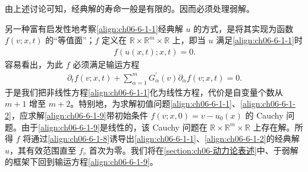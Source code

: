 \documentclass[../../main.tex]{subfiles}
\begin{document}
由上述讨论可知，经典解的寿命一般是有限的。因而必须处理弱解。

另一种富有启发性地考察\eqref{align:ch06-6-1-1}经典解 $u$ 的方式，是将其实现为函数 $f(v;x,t)$ 的“等值面”；$f$ 定义在 $\mathbb{R}\times\mathbb{R}^{m}\times\mathbb{R}$ 上，即当 $u$ 满足\eqref{align:ch06-6-1-1}时
\begin{align}
f(u(x,t);x,t)=0.
\label{align:ch06-6-1-8}
\end{align}
容易看出，为此 $f$ 必须满足输运方程
\begin{align}
\partial_{t}f(v;x,t)+\sum_{\alpha=1}^{m}G_{\alpha}^{\prime}(v)\partial_{\alpha}f(v;x,t)=0.
\label{align:ch06-6-1-9}
\end{align}
于是我们把非线性方程\eqref{align:ch06-6-1-1}化为线性方程，代价是自变量个数从 $m+1$ 增至 $m+2$。特别地，为求解初值问题\eqref{align:ch06-6-1-1}、\eqref{align:ch06-6-1-2}，应求解\eqref{align:ch06-6-1-9}带初始条件 $f(v;x,0)=v-u_{0}(x)$ 的 Cauchy 问题。由于\eqref{align:ch06-6-1-9}是线性的，该 Cauchy 问题在 $\mathbb{R}\times\mathbb{R}^{m}\times\mathbb{R}$ 上存在解。所得 $f$ 将通过\eqref{align:ch06-6-1-8}诱导出\eqref{align:ch06-6-1-1}、\eqref{align:ch06-6-1-2}的经典解 $u$，其有效范围直至 $f_{v}$ 首次为零。我们将在\cref{section:ch06-动力论表述}中、于弱解的框架下回到输运方程\eqref{align:ch06-6-1-9}。
\end{document}
